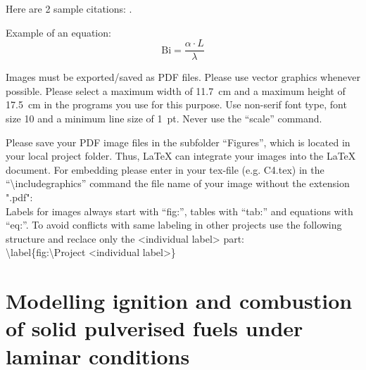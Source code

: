 \begin{btUnit}
Here are 2 sample citations: \cite{Cetin2004,Fletcher2019}.

Example of an equation:
\begin{equation}
	\mathrm{Bi} = \frac{\alpha \cdot L}{\lambda}
\end{equation}


Images must be exported/saved as PDF files. Please use vector graphics whenever possible. Please select a maximum width of \SI{11.7}{\centi \meter} and a maximum height of \SI{17.5}{\centi \meter} in the programs you use for this purpose.
Use non-serif font type, font size 10 and a minimum line size of \SI{1}{pt}. Never use the \enquote{scale} command.  

Please save your PDF image files in the subfolder \enquote{Figures}, which is located in your local project folder. Thus, LaTeX can integrate your images into the LaTeX document. For embedding please enter in your tex-file (e.g. C4.tex) in the \enquote{\textbackslash includegraphics} command the file name of your image without the extension ".pdf": \\ 

Labels for images always start with \enquote{fig:}, tables with \enquote{tab:} and equations with \enquote{eq:}. To avoid conflicts with same labeling in other projects use the following structure and reclace only the <individual label> part: \\

\textbackslash label\{fig:\textbackslash Project <individual label>\}



\newpage
\section{Modelling ignition and combustion of solid pulverised fuels under laminar conditions}


\end{btUnit}
